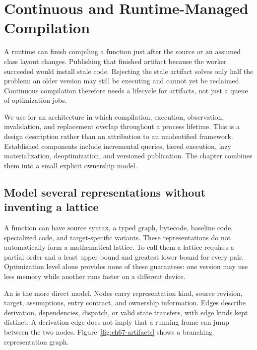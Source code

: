 \chapter{Continuous and Runtime-Managed Compilation}
\label{ch:continuous-compilation}

A runtime can finish compiling a function just after the source or an assumed class layout changes.
Publishing that finished artifact because the worker succeeded would install stale code.
Rejecting the stale artifact solves only half the problem: an older version may still be executing and cannot yet be reclaimed.
Continuous compilation therefore needs a lifecycle for artifacts, not just a queue of optimization jobs.

We use  for an architecture in which compilation, execution, observation, invalidation, and replacement overlap throughout a process lifetime.
This is a design description rather than an attribution to an unidentified framework.
Established components include incremental queries, tiered execution, lazy materialization, deoptimization, and versioned publication.
The chapter combines them into a small explicit ownership model.

\section{Model several representations without inventing a lattice}
\label{sec:ch67-representations}

A function can have source syntax, a typed graph, bytecode, baseline code, specialized code, and target-specific variants.
These representations do not automatically form a mathematical lattice.
To call them a lattice requires a partial order and a least upper bound and greatest lower bound for every pair.
Optimization level alone provides none of these guarantees: one version may use less memory while another runs faster on a different device.

An  is the more direct model.
Nodes carry representation kind, source revision, target, assumptions, entry contract, and ownership information.
Edges describe derivation, dependencies, dispatch, or valid state transfers, with edge kinds kept distinct.
A derivation edge does not imply that a running frame can jump between the two nodes.
Figure~\ref{fig:ch67-artifacts} shows a branching representation graph.

